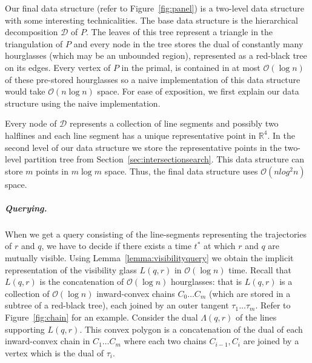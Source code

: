 \documentclass[a4paper, UKenglish]{lipics-v2018}
\begin{document}
Our final data structure (refer to Figure~\ref{fig:panel}) is a two-level data structure with some interesting technicalities. The base data structure is the hierarchical decomposition $\mathcal{D}$ of $P$. The leaves of this tree represent a triangle in the triangulation of $P$ and every node in the tree stores the dual of constantly many hourglasses (which may be an unbounded region), represented as a red-black tree on its edges. Every vertex of $P$ in the primal, is contained in at most $\mathcal{O}(\log n)$ of these pre-stored hourglasses \cite{guibas1989optimal} so a naive implementation of this data structure would take $\mathcal{O}(n \log n)$ space. For ease of exposition, we first explain our data structure using the naive implementation. 

Every node of $\mathcal{D}$ represents a collection of line segments and possibly two halflines and each line segment has a unique representative point in $\mathbb{R}^4$. In the second level of our data structure we store the representative points in the two-level partition tree from Section~\ref{sec:intersectionsearch}. This data structure can store $m$ points in $m \log m$ space. Thus, the final data structure uses $\mathcal{O}(n log^2 n)$ space.

\subparagraph{Querying.}
When we get a query consisting of the line-segments
representing the trajectories of $r$ and $q$, we have to decide if there exists
a time $t^*$ at which $r$ and $q$ are mutually visible. Using Lemma~\ref{lemma:visibilityquery} we obtain the implicit representation of the visibility glass $L(q,r)$ in $\mathcal{O}(\log n)$ time. Recall that $L(q,r)$ is the concatenation of $\mathcal{O}(\log n)$ hourglasses: that is $L(q,r)$ is a collection of $\mathcal{O}(\log n)$ inward-convex chains $C_0 \ldots C_m$ (which are stored in a subtree of a red-black tree), each joined by an outer tangent $\tau_1 \ldots \tau_{m}$. Refer to Figure~\ref{fig:chain} for an example. Consider the dual $\Lambda(q,r)$ of the lines supporting $L(q,r)$. This convex polygon is a concatenation of the dual of each inward-convex chain in $C_1 \ldots C_m$ where each two chains $C_{i-1}, C_{i}$ are joined by a vertex which is the dual of $\tau_i$. 
\end{document}
